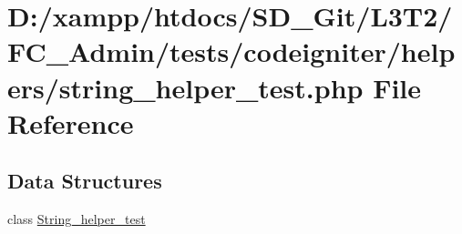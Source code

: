 \hypertarget{string__helper__test_8php}{}\section{D\+:/xampp/htdocs/\+S\+D\+\_\+\+Git/\+L3\+T2/\+F\+C\+\_\+\+Admin/tests/codeigniter/helpers/string\+\_\+helper\+\_\+test.php File Reference}
\label{string__helper__test_8php}
\subsection*{Data Structures}
\begin{DoxyCompactItemize}
\item 
class \hyperlink{class_string__helper__test}{String\+\_\+helper\+\_\+test}
\end{DoxyCompactItemize}
